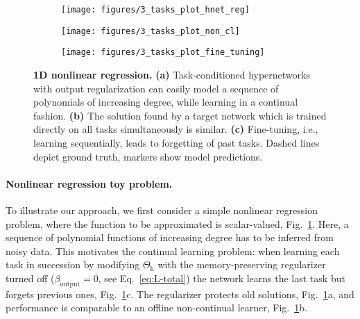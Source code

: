 \documentclass{article}
\begin{document}
\begin{figure}[htbp]
    \begin{subfigure}{0.32\linewidth}
    \caption{\vspace{-0.15cm}}
    \texttt{[image: figures/3\_tasks\_plot\_hnet\_reg]}
    \end{subfigure}
    \begin{subfigure}{0.32\linewidth}
    \caption{\vspace{-0.15cm}}
    \texttt{[image: figures/3\_tasks\_plot\_non\_cl]}
    \end{subfigure}
    \begin{subfigure}{0.32\linewidth}
    \caption{\vspace{-0.15cm}}
    \texttt{[image: figures/3\_tasks\_plot\_fine\_tuning]}
    \end{subfigure}
  \vspace{-0.3cm}
  \caption{\textbf{1D nonlinear regression.} \textbf{(a)} Task-conditioned hypernetworks with output regularization can easily model a sequence of polynomials of increasing degree, while learning in a continual fashion. \textbf{(b)} The solution found by a target network which is trained directly on all tasks simultaneously is similar. \textbf{(c)} Fine-tuning, i.e., learning sequentially, leads to forgetting of past tasks. Dashed lines depict ground truth, markers show model predictions. \label{fig:regression}}
\end{figure}

\vspace{-2mm}
\paragraph{Nonlinear regression toy problem.} To illustrate our approach, we first consider a simple nonlinear regression problem, where the function to be approximated is scalar-valued, Fig.~\ref{fig:regression}. Here, a sequence of polynomial functions of increasing degree has to be inferred from noisy data. This motivates the continual learning problem: when learning each task in succession by modifying $\Theta_\text{h}$ with the memory-preserving regularizer turned off ($\beta_\text{output}=0$, see Eq.~\ref{eq:L-total}) the network learns the last task but forgets previous ones, Fig.~\ref{fig:regression}c. The regularizer protects old solutions, Fig.~\ref{fig:regression}a, and performance is comparable to an offline non-continual learner, Fig.~\ref{fig:regression}b.
\end{document}
